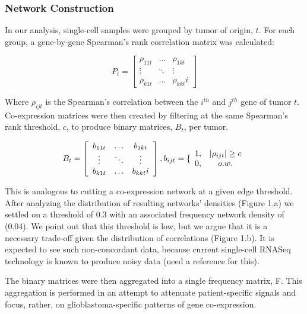 \documentclass[11pt,twoside,a4paper]{article}
\begin{document}
\subsubsection{Network Construction}
In our analysis, single-cell samples were grouped by tumor of origin, $t$. For each group, a gene-by-gene Spearman’s rank correlation matrix was calculated: 

\begin{equation}\label{equation3}
 P_t = \left[ \begin{array}{ccc}
\rho_{11t} & \ldots & \rho_{1kt} \\
\vdots & \ddots & \vdots \\
\rho_{k1t} & \ldots & \rho_{kkt}i \end{array} \right]
\end{equation}%

Where $\rho_{ijt}$ is the Spearman’s correlation between the $i^{th}$ and $j^{th}$ gene of tumor $t$. Co-expression matrices were then created by filtering at the same Spearman’s rank threshold, $c$, to produce binary matrices, $B_t$, per tumor. 

\begin{equation}\label{equation4}
B_t = \left[ \begin{array}{ccc}
b_{11t} & \ldots & b_{1kt} \\
\vdots & \ddots & \vdots \\
b_{k1t} & \ldots & b_{kkt}i \end{array} \right] \\
, b_{ijt}=\{ \begin{array} {cc}
1, & \vert\rho_{ijt}\vert\ge c \\
0, & o.w. \\
\end{array}
\end{equation}

This is analogous to cutting a co-expression network at a given edge threshold. After analyzing the distribution of resulting networks’ densities (Figure 1.a) we settled on a threshold of 0.3 with an associated frequency network density of (0.04). We point out that this threshold is low, but we argue that it is a necessary trade-off given the distribution of correlations (Figure 1.b). It is expected to see such non-concordant data, because current single-cell RNASeq technology is known to produce noisy data (need a reference for this).

The binary matrices were then aggregated into a single frequency matrix, F. This aggregation is performed in an attempt to attenuate patient-specific signals and focus, rather, on glioblastoma-specific patterns of gene co-expression.
\end{document}
